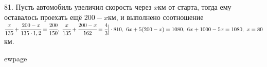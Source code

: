 81. Пусть автомобиль увеличил скорость через $x$км от старта, тогда ему оставалось проехать ещё $200-x$км, и выполнено соотношение
$\cfrac{x}{135}+\cfrac{200-x}{135\cdot1,2}=\cfrac{200}{150},\
\cfrac{x}{135}+\cfrac{200-x}{162}=\cfrac{4}{3}\Big|\cdot 810,\
6x+5(200-x)=1080,\ 6x+1000-5x=1080,\ x=80$км.

ewpage
